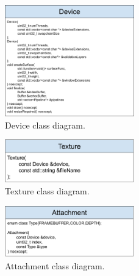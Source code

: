 \documentclass[12pt]{report}
\newcommand{\figurewidth}{0.6\textwidth}
\newcommand{\imagewidth}{0.5\textwidth}
\theoremstyle{definition}
\begin{document}
  \begin{figure}
    \centering
    \includegraphics[width=\imagewidth]{images/class_device.png}
    \caption{Device class diagram.}
    \label{fig:class_device}  
  \end{figure}

  \begin{figure}
    \centering
    \includegraphics[width=\imagewidth]{images/class_texture.png}
    \caption{Texture class diagram.}
    \label{fig:class_texture}  
  \end{figure}

  \begin{figure}
    \centering
    \includegraphics[width=\imagewidth]{images/class_attachment.png}
    \caption{Attachment class diagram.}
    \label{fig:class_attachment}  
  \end{figure}
\end{document}
